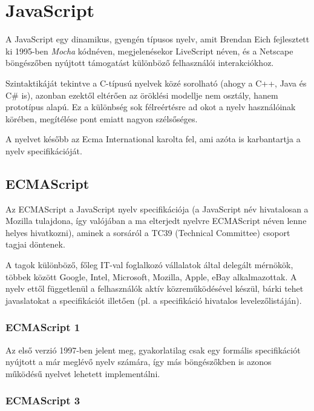 \section{JavaScript}

A JavaScript egy dinamikus, gyengén típusos nyelv, amit Brendan Eich
fejlesztett ki 1995-ben \emph{Mocha} kódnéven, megjelenésekor LiveScript néven,
és a Netscape böngészőben nyújtott támogatást különböző felhasználói
interakciókhoz.\cite{JSAnnounce}

Szintaktikáját tekintve a C-típusú nyelvek közé sorolható (ahogy a C++, Java és
C\# is), azonban ezektől eltérően az öröklési modellje nem osztály, hanem
prototípus alapú. Ez a különbség sok félreértésre ad okot a nyelv használóinak
körében, megítélése pont emiatt nagyon szélsőséges.

A nyelvet később az Ecma International karolta fel, ami azóta is karbantartja
a nyelv specifikációját.

\subsection{ECMAScript}

Az ECMAScript a JavaScript nyelv specifikációja (a JavaScript név hivatalosan
a Mozilla tulajdona, így valójában a ma elterjedt nyelvre ECMAScript néven
lenne helyes hivatkozni), aminek a sorsáról a TC39 (Technical Committee)
csoport tagjai döntenek.\cite{TC39}

A tagok különböző, főleg IT-val foglalkozó vállalatok által delegált mérnökök,
többek között Google, Intel, Microsoft, Mozilla, Apple, eBay
alkalmazottak.
A nyelv ettől függetlenül a felhasználók aktív közreműködésével készül,
bárki tehet javaslatokat a specifikációt illetően (pl. a specifikáció hivatalos
levelezőlistáján\cite{ESDiscuss}).

\subsubsection{ECMAScript 1}

Az első verzió\cite{ECMAScript-1} 1997-ben jelent meg, gyakorlatilag csak egy
formális specifikációt nyújtott a már meglévő nyelv számára,
így más böngészőkben is azonos működésű nyelvet lehetett implementálni.

\subsubsection{ECMAScript 3}


